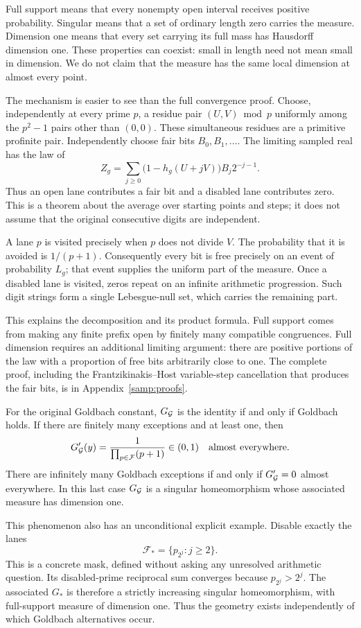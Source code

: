 Full support means that every nonempty open interval receives positive
probability.  Singular means that a set of ordinary length zero carries
the measure.  Dimension one means that every set carrying its full mass
has Hausdorff dimension one.  These properties can coexist: small in
length need not mean small in dimension.  We do not claim that the
measure has the same local dimension at almost every point.

The mechanism is easier to see than the full convergence proof.
Choose, independently at every prime $p$, a residue pair $(U,V)\bmod p$
uniformly among the $p^2-1$ pairs other than $(0,0)$.  These simultaneous
residues are a primitive profinite pair.  Independently choose fair
bits $B_0,B_1,\ldots$.  The limiting sampled real has the law of
\[
 Z_g=\sum_{j\ge0}\bigl(1-h_g(U+jV)\bigr)B_j2^{-j-1}.
\]
Thus an open lane contributes a fair bit and a disabled lane contributes
zero.  This is a theorem about the average over starting points and
steps; it does not assume that the original consecutive digits are
independent.

A lane $p$ is visited precisely when $p$ does not divide $V$.  The
probability that it is avoided is $1/(p+1)$.  Consequently every bit is
free precisely on an event of probability $L_g$; that event supplies the
uniform part of the measure.  Once a disabled lane is visited, zeros
repeat on an infinite arithmetic progression.  Such digit strings form
a single Lebesgue-null set, which carries the remaining part.

This explains the decomposition and its product formula.  Full support
comes from making any finite prefix open by finitely many compatible
congruences.  Full dimension requires an additional limiting argument:
there are positive portions of the law with a proportion of free bits
arbitrarily close to one.  The complete proof, including the
Frantzikinakis--Host variable-step cancellation that produces the fair
bits, is in Appendix~\ref{samp:proofs}.


\begin{corollary}\label{samp:goldbach-trichotomy}
For the original Goldbach constant, $G_{\mathcal G}$ is the identity if and
only if Goldbach holds.  If there are finitely many exceptions and at least one, then
\[
 G_{\mathcal G}'(y)=\frac1{\prod_{p\in\mathcal F}(p+1)}\in(0,1)
 \quad\hbox{almost everywhere}.
\]
There are infinitely many Goldbach exceptions if and only if
$G_{\mathcal G}'=0$ almost everywhere.  In this last case $G_{\mathcal G}$ is a singular
homeomorphism whose associated measure has dimension one.
\end{corollary}

This phenomenon also has an unconditional explicit example.  Disable
exactly the lanes
\begin{equation}
 \mathcal F_* =\{p_{2^j}:j\ge2\}.
 \label{samp:explicit-mask}
\end{equation}
This is a concrete mask, defined without asking any unresolved arithmetic
question.  Its disabled-prime reciprocal sum converges because $p_{2^j}>2^j$.  The associated
$G_*$ is therefore a strictly increasing singular homeomorphism,
with full-support measure of dimension one.  Thus the geometry
exists independently of which Goldbach alternatives occur.
